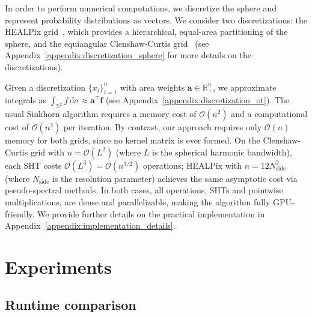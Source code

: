 \documentclass{article}
\theoremstyle{plain}
\theoremstyle{definition}
\theoremstyle{remark}
\renewcommand{\S}{\ensuremath{\mathbb{S}}}
\renewcommand{\vector}[1]{\mathrm{\mathbf{#1}}}
\begin{document}
In order to perform numerical computations, we discretize the sphere and represent
probability distributions as vectors. We consider two discretizations: the HEALPix
grid~\cite{gorski2005healpix}, which provides a hierarchical, equal-area partitioning
of the sphere, and the equiangular Clenshaw-Curtis grid~\cite{clenshaw1960} (see Appendix~\ref{appendix:discretization_sphere} for more details on the discretizations).

Given a discretization $\{x_i\}_{i=1}^n$ with area weights $\vector{a} \in \mathbb{R}^n_+$,
we approximate integrals as $\int_{\S^2} f\,\mathrm{d}\sigma \approx \vector{a}^\top \vector{f}$ (see Appendix~\ref{appendix:discretization_ot}).
The usual Sinkhorn algorithm requires a memory cost of $\mathcal{O}(n^2)$ and a computational cost of $\mathcal{O}(n^2)$ per iteration.
By contrast, our approach requires only $\mathcal{O}(n)$ memory
for both grids, since no kernel matrix is ever formed.
On the Clenshaw-Curtis grid with $n = \mathcal{O}(L^2)$ (where $L$ is the spherical harmonic bandwidth), each SHT costs $\mathcal{O}(L^3) = \mathcal{O}(n^{3/2})$
operations; HEALPix with $n = 12N_\mathrm{side}^2$ (where $N_\mathrm{side}$ is the resolution parameter) achieves the same asymptotic
cost via pseudo-spectral methods.
In both cases, all operations, SHTs and pointwise multiplications, are dense and
parallelizable, making the algorithm fully GPU-friendly. We provide further details on the practical implementation in Appendix~\ref{appendix:implementation_details}.



\section{Experiments}
\subsection{Runtime comparison}
\end{document}
